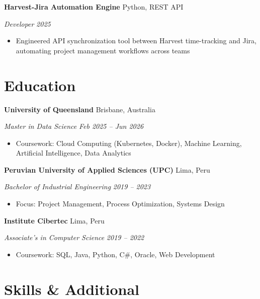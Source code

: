 \documentclass[11pt,letterpaper]{article}
\newcommand{\entry}[4]{%
  \noindent\textbf{#1} \hfill #2 \par\nopagebreak
  \textit{#3} \hfill \textit{#4} \par\nopagebreak
}
\begin{document}
\entry{Harvest-Jira Automation Engine}{Python, REST API}{Developer}{2025}
\begin{itemize}
  \item Engineered API synchronization tool between Harvest time-tracking and Jira, automating project management workflows across teams
\end{itemize}
\vspace{0.3em}

\section{Education}

\entry{University of Queensland}{Brisbane, Australia}{Master in Data Science}{Feb 2025 -- Jun 2026}
\begin{itemize}
  \item Coursework: Cloud Computing (Kubernetes, Docker), Machine Learning, Artificial Intelligence, Data Analytics
\end{itemize}
\vspace{0.3em}

\entry{Peruvian University of Applied Sciences (UPC)}{Lima, Peru}{Bachelor of Industrial Engineering}{2019 -- 2023}
\begin{itemize}
  \item Focus: Project Management, Process Optimization, Systems Design
\end{itemize}
\vspace{0.3em}

\entry{Institute Cibertec}{Lima, Peru}{Associate's in Computer Science}{2019 -- 2022}
\begin{itemize}
  \item Coursework: SQL, Java, Python, C\#, Oracle, Web Development
\end{itemize}
\vspace{0.3em}

\section{Skills \& Additional}
\end{document}
